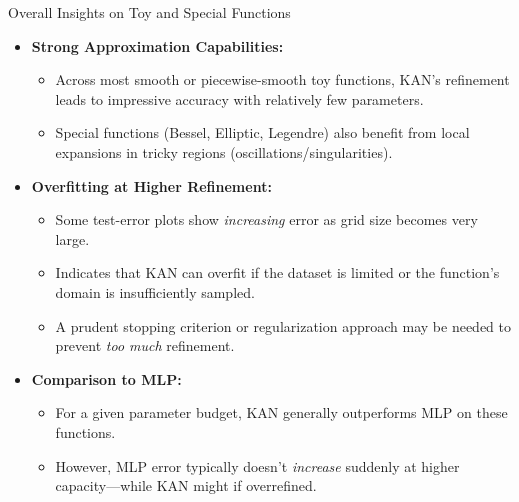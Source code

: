 \documentclass{beamer}
\begin{document}
\begin{frame}{Overall Insights on Toy and Special Functions}
  \begin{itemize}
    \item \textbf{Strong Approximation Capabilities:}
      \begin{itemize}
        \item Across most smooth or piecewise-smooth toy functions, KAN’s refinement leads to impressive accuracy with relatively few parameters.
        \item Special functions (Bessel, Elliptic, Legendre) also benefit from local expansions in tricky regions (oscillations/singularities).
      \end{itemize}
    \item \textbf{Overfitting at Higher Refinement:}
      \begin{itemize}
        \item Some test-error plots show \emph{increasing} error as grid size becomes very large.
        \item Indicates that KAN can overfit if the dataset is limited or the function’s domain is insufficiently sampled.
        \item A prudent stopping criterion or regularization approach may be needed to prevent \emph{too much} refinement.
      \end{itemize}
    \item \textbf{Comparison to MLP:}
      \begin{itemize}
        \item For a given parameter budget, KAN generally outperforms MLP on these functions.
        \item However, MLP error typically doesn’t \emph{increase} suddenly at higher capacity—while KAN might if overrefined.
      \end{itemize}
  \end{itemize}
\end{frame}


\end{document}
